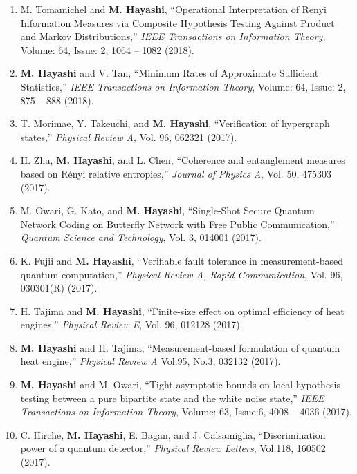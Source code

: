 \documentclass[a4paper,12pt,oneside]{article}
\begin{document}
\begin{enumerate}
\item 
M. Tomamichel and \textbf{M. Hayashi}, 
``Operational Interpretation of Renyi Information Measures via Composite Hypothesis Testing Against Product and Markov Distributions,''
{\em IEEE Transactions on Information Theory},
Volume: 64, Issue: 2, 1064 -- 1082 (2018). 

\item 
\textbf{M. Hayashi} and V. Tan, 
``Minimum Rates of Approximate Sufficient Statistics,''
{\em IEEE Transactions on Information Theory},
Volume: 64, Issue: 2, 875 -- 888 (2018). 

\item 
T. Morimae, Y. Takeuchi, and \textbf{M. Hayashi},
``Verification of hypergraph states,''
{\em Physical Review A}, Vol. 96, 062321 (2017).

\item 
H. Zhu, \textbf{M. Hayashi}, and L. Chen, 
``Coherence and entanglement measures based on R\'{e}nyi relative entropies,''
{\em Journal of Physics A},
Vol. 50, 475303 (2017).

\item
M. Owari, G. Kato, and \textbf{M. Hayashi},
``Single-Shot Secure Quantum Network Coding on Butterfly Network with Free Public Communication,''
{\em Quantum Science and Technology},
Vol. 3, 014001 (2017). 

\item
K. Fujii and \textbf{M. Hayashi},
``Verifiable fault tolerance in measurement-based quantum computation,''
{\em Physical Review A, Rapid Communication},
Vol. 96, 030301(R) (2017).

\item
H. Tajima and \textbf{M. Hayashi},
``Finite-size effect on optimal efficiency of heat engines,''
{\em Physical Review E}, Vol. 96, 012128 (2017).

\item
\textbf{M. Hayashi} and H. Tajima, 
``Measurement-based formulation of quantum heat engine,'' 
{\em Physical Review A} Vol.95, No.3, 032132 (2017). 

\item
\textbf{M. Hayashi} and M. Owari, 
``Tight asymptotic bounds on local hypothesis testing between a pure bipartite state and the white noise state,'' 
{\em IEEE Transactions on Information Theory}, 
Volume: 63, Issue:6, 4008 -- 4036 (2017). 

\item
C. Hirche, \textbf{M. Hayashi}, E. Bagan, and J. Calsamiglia, 
``Discrimination power of a quantum detector,'' 
{\em Physical Review Letters}, Vol.118, 160502 (2017). 


\end{enumerate}
\end{document}
